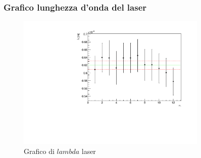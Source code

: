 \subsubsection{Grafico lunghezza d'onda del laser}
\begin{figure}[H]
    \centering
    \includegraphics[width=0.81\textwidth]{graphlambda.pdf}
    \caption{Grafico di $lambda$ laser}
\end{figure}
